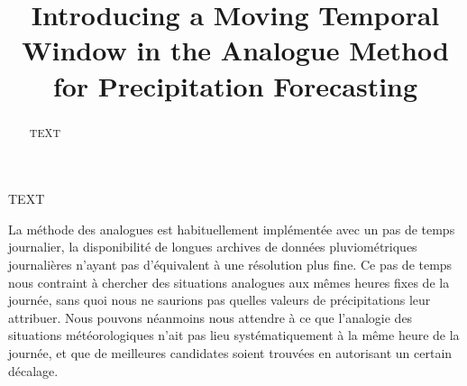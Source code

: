 \documentclass[hess]{copernicus}
\begin{document}
\linenumbers

\title{Introducing a Moving Temporal Window in the Analogue Method for Precipitation Forecasting}













\received{}
\pubdiscuss{} %
\revised{}
\accepted{}
\published{}




\maketitle



\begin{abstract}
TEXT
\end{abstract}



\introduction  %
TEXT



La méthode des analogues est habituellement implémentée avec un pas de temps journalier, la disponibilité de longues archives de données pluviométriques journalières n'ayant pas d'équivalent à une résolution plus fine. Ce pas de temps nous contraint à chercher des situations analogues aux mêmes heures fixes de la journée, sans quoi nous ne saurions pas quelles valeurs de précipitations leur attribuer. Nous pouvons néanmoins nous attendre à ce que l'analogie des situations météorologiques n'ait pas lieu systématiquement à la même heure de la journée, et que de meilleures candidates soient trouvées en autorisant un certain décalage.
\end{document}
